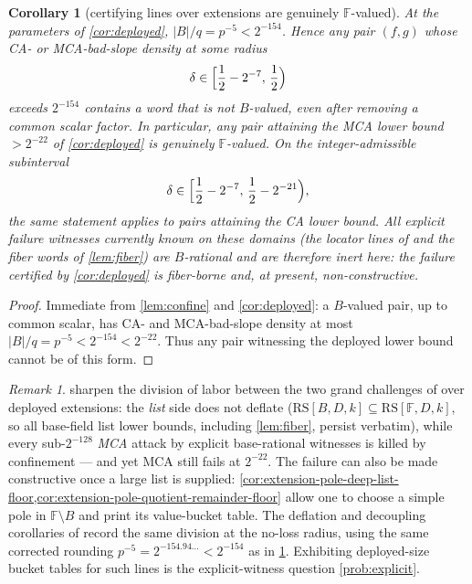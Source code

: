 \documentclass[11pt]{article}
\newtheorem{corollary}[corollary]{Corollary}
\theoremstyle{definition}
\theoremstyle{remark}
\newtheorem{remark}[remark]{Remark}
\newcommand{\F}{\mathbb{F}}
\newcommand{\B}{B}
\newcommand{\RS}{\mathrm{RS}}
\begin{document}
\begin{corollary}[certifying lines over extensions are genuinely $\F$-valued]\label{cor:Fvalued}
At the parameters of \cref{cor:deployed}, $|\B|/q=p^{-5}<2^{-154}$. Hence any pair $(f,g)$ whose CA- or MCA-bad-slope density at some radius
\[
        \delta\in
        \Bigl[\frac12-2^{-7},\,\frac12\Bigr)
\]
exceeds $2^{-154}$ contains a word that is not $\B$-valued, even after removing a common scalar factor. In particular, any pair attaining the MCA lower bound $>2^{-22}$ of \cref{cor:deployed} is genuinely $\F$-valued. On the integer-admissible subinterval
\[
        \delta\in
        \Bigl[\frac12-2^{-7},\,\frac12-2^{-21}\Bigr),
\]
the same statement applies to pairs attaining the CA lower bound. All explicit failure witnesses currently known on these domains (the locator lines of \cite{Cho26a,Cho26b} and the fiber words of \cref{lem:fiber}) are $\B$-rational and are therefore inert here: the failure certified by \cref{cor:deployed} is fiber-borne and, at present, non-constructive.
\end{corollary}

\begin{proof}
Immediate from \cref{lem:confine} and \cref{cor:deployed}: a $\B$-valued pair, up to common scalar, has CA- and MCA-bad-slope density at most $|\B|/q=p^{-5}<2^{-154}<2^{-22}$. Thus any pair witnessing the deployed lower bound cannot be of this form.
\end{proof}

\begin{remark}
 sharpen the division of labor between the two grand challenges of \cite{ABF26} over deployed extensions: the \emph{list} side does not deflate ($\RS[\B,D,k]\subseteq\RS[\F,D,k]$, so all base-field list lower bounds, including \cref{lem:fiber}, persist verbatim), while every sub-$2^{-128}$ \emph{MCA} attack by explicit base-rational witnesses is killed by confinement --- and yet MCA still fails at $2^{-22}$.  The failure can also be made constructive once a large list is supplied: \cref{cor:extension-pole-deep-list-floor,cor:extension-pole-quotient-remainder-floor} allow one to choose a simple pole in $\F\setminus\B$ and print its value-bucket table. The deflation and decoupling corollaries of \cite{Cho26b} record the same division at the no-loss radius, using the same corrected rounding $p^{-5}=2^{-154.94\ldots}<2^{-154}$ as in \cref{cor:Fvalued}. Exhibiting deployed-size bucket tables for such lines is the explicit-witness question \cref{prob:explicit}.
\end{remark}
\end{document}
